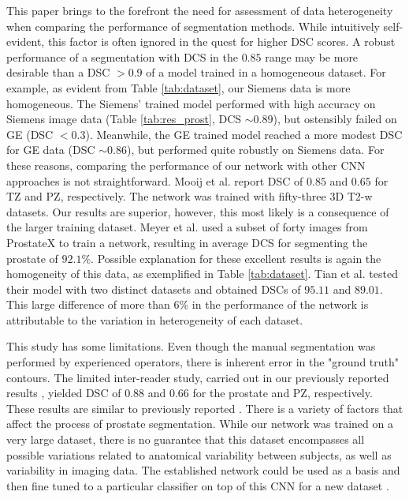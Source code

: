 This paper brings to the forefront the need for assessment of data heterogeneity when comparing the performance of segmentation methods. While intuitively self-evident, this factor is often ignored in the quest for higher DSC scores. A robust performance of a segmentation with DCS in the $0.85$ range may be more desirable than a DSC $> 0.9$ of a model trained in a homogeneous dataset. For example, as evident from Table \ref{tab:dataset}, our Siemens data is more homogeneous. The Siemens' trained model performed with high accuracy on Siemens image data (Table \ref{tab:res_prost}, DCS $\sim0.89$), but ostensibly failed on GE (DSC $< 0.3$). Meanwhile, the GE trained model reached a more modest DSC for GE data (DSC $\sim0.86$), but performed quite robustly on Siemens data. 
For these reasons, comparing the performance of our network with other CNN approaches is not straightforward. Mooij et al. \cite{mooij_automatic_2018} report DSC of $0.85$ and $0.65$ for TZ and PZ, respectively. The network was trained with fifty-three 3D T2-w datasets. Our results are superior, however, this most likely is a consequence of the larger training dataset. Meyer et al. \cite{anneke} used a subset of forty images from ProstateX to train a network, resulting in average DCS for segmenting the prostate of $92.1\%$. Possible explanation for these excellent results is again the homogeneity of this data, as exemplified in Table \ref{tab:dataset}. Tian et al. \cite{to2018deep} tested their model with two distinct datasets and obtained DSCs of $95.11$ and $89.01$. This large difference of more than $6\%$ in the performance of the network is attributable to the variation in heterogeneity of each dataset. 

This study has some limitations. Even though the manual segmentation was performed by experienced operators, there is inherent error in the "ground truth" contours. The limited inter-reader study, carried out in our previously reported results \cite{deukwoo_classification_2018}, yielded DSC of $0.88$ and $0.66$ for the prostate and PZ, respectively. These results are similar to previously reported \cite{4_klein2008automatic}. There is a variety of factors that affect the process of prostate segmentation. While our network was trained on a very large dataset, there is no guarantee that this dataset encompasses all possible variations related to anatomical variability between subjects, as well as variability in imaging data. The established network could be used as a basis and then fine tuned to a particular classifier on top of this CNN for a new dataset \cite{tajbakhsh2016convolutional}.
